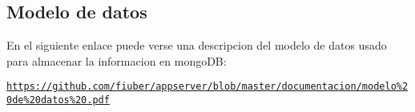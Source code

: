 \subsection*{Modelo de datos}

En el siguiente enlace puede verse una descripcion del modelo de datos usado para almacenar la informacion en mongo\-D\-B\-:

\href{https://github.com/fiuber/appserver/blob/master/documentacion/modelo%20de%20datos%20.pdf}{\tt https\-://github.\-com/fiuber/appserver/blob/master/documentacion/modelo\%20de\%20datos\%20.\-pdf} 